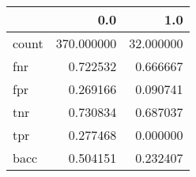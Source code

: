 \begin{tabular}{lrr}
\toprule
{} &         0.0 &        1.0 \\
\midrule
count &  370.000000 &  32.000000 \\
fnr   &    0.722532 &   0.666667 \\
fpr   &    0.269166 &   0.090741 \\
tnr   &    0.730834 &   0.687037 \\
tpr   &    0.277468 &   0.000000 \\
bacc  &    0.504151 &   0.232407 \\
\bottomrule
\end{tabular}
